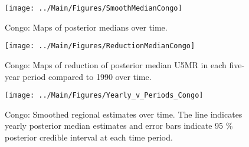 \documentclass[12pt]{article}\usepackage[]{graphicx}\usepackage[]{color}
\newenvironment{knitrout}{}{} %
\begin{document}
\begin{knitrout}
\color{fgcolor}\begin{figure}[bht]

{\centering \texttt{[image: ../Main/Figures/SmoothMedianCongo]} 

}

\caption[Congo]{Congo: Maps of posterior medians over time.}\label{fig:unnamed-chunk-74}
\end{figure}


\end{knitrout}
\begin{knitrout}
\color{fgcolor}\begin{figure}[bht]

{\centering \texttt{[image: ../Main/Figures/ReductionMedianCongo]} 

}

\caption[Congo]{Congo: Maps of reduction of posterior median U5MR in each five-year period compared to 1990 over time.}\label{fig:unnamed-chunk-75}
\end{figure}


\end{knitrout}
\begin{knitrout}
\color{fgcolor}\begin{figure}[bht]

{\centering \texttt{[image: ../Main/Figures/Yearly\_v\_Periods\_Congo]} 

}

\caption[Congo]{Congo: Smoothed regional estimates over time. The line indicates yearly posterior median estimates and error bars indicate 95 \% posterior credible interval at each time period.}\label{fig:unnamed-chunk-76}
\end{figure}


\end{knitrout}
\end{document}
